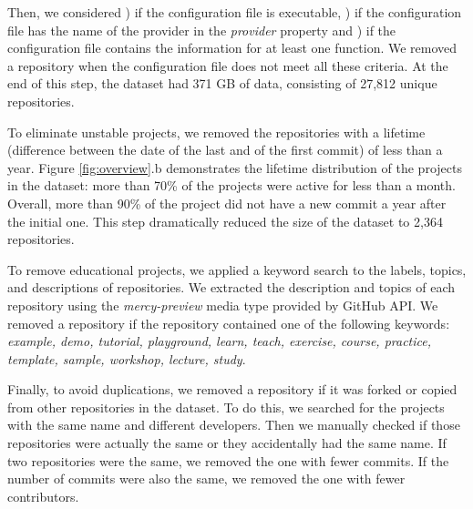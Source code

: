Then, 
we considered ) if the configuration file is executable, ) if 
the configuration file has the name of the provider in the 
\emph{provider} property and 
) if the configuration file contains the information for at least one 
function. We removed a repository when the configuration file
does not meet all these criteria. 
%
At the end of this step, the dataset had 371 GB of data, consisting 
of 27,812 unique repositories. 

To eliminate unstable projects, we removed the repositories with a lifetime 
(difference between the date of the last and of the first commit)
of less than a year. 
Figure \ref{fig:overview}.b demonstrates the lifetime distribution of the 
projects in the dataset: more than 70\% of the projects 
were active for less than a month. Overall, more than 90\% 
of the project did not have a new commit a year after the initial one. 
This step dramatically reduced the size of the dataset to 2,364 
repositories.

To remove educational projects, 
we applied a keyword search to the labels, topics, and 
descriptions of repositories. We extracted the description 
and topics of each repository using the \emph{mercy-preview} media 
type provided by GitHub API. We removed a repository 
if the repository contained one of the following keywords: 
\emph{example, demo, tutorial, playground, learn, teach, exercise, 
	course, practice, template, sample, workshop, lecture, study}.

Finally, to avoid duplications, we removed a repository if it was forked 
or copied from other repositories in the dataset. To do this, we 
searched for the projects with the same name and different developers. 
Then we manually checked if those repositories were actually the same or 
they accidentally had the same name. If two repositories were the same, 
we removed the one with fewer commits. If the number of commits were 
also the same, we removed the one with fewer contributors.





